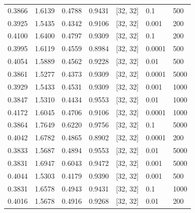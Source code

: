 \begin{tabular}{lllllll}
0.3866 & 1.6139 & 0.4788 & 0.9431 & [32, 32] & 0.1 & 500 \\
0.3925 & 1.5435 & 0.4342 & 0.9106 & [32, 32] & 0.001 & 200 \\
0.4100 & 1.6400 & 0.4797 & 0.9309 & [32, 32] & 0.1 & 200 \\
0.3995 & 1.6119 & 0.4559 & 0.8984 & [32, 32] & 0.0001 & 500 \\
0.4054 & 1.5889 & 0.4562 & 0.9228 & [32, 32] & 0.01 & 500 \\
0.3861 & 1.5277 & 0.4373 & 0.9309 & [32, 32] & 0.0001 & 5000 \\
0.3929 & 1.5433 & 0.4531 & 0.9309 & [32, 32] & 0.001 & 1000 \\
0.3847 & 1.5310 & 0.4434 & 0.9553 & [32, 32] & 0.01 & 1000 \\
0.4172 & 1.6045 & 0.4706 & 0.9106 & [32, 32] & 0.0001 & 1000 \\
0.3864 & 1.7649 & 0.6220 & 0.9756 & [32, 32] & 0.1 & 5000 \\
0.4042 & 1.6782 & 0.4865 & 0.8902 & [32, 32] & 0.0001 & 200 \\
0.3833 & 1.5687 & 0.4894 & 0.9553 & [32, 32] & 0.01 & 5000 \\
0.3831 & 1.6947 & 0.6043 & 0.9472 & [32, 32] & 0.001 & 5000 \\
0.4044 & 1.5303 & 0.4179 & 0.9390 & [32, 32] & 0.001 & 500 \\
0.3831 & 1.6578 & 0.4943 & 0.9431 & [32, 32] & 0.1 & 1000 \\
0.4016 & 1.5678 & 0.4916 & 0.9268 & [32, 32] & 0.01 & 200 \\
\bottomrule
\end{tabular}
